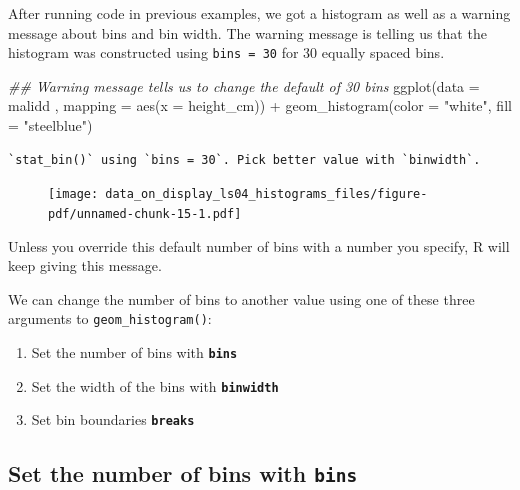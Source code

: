\documentclass[
  letterpaper,
  DIV=11,
  numbers=noendperiod]{scrreprt}
\newenvironment{Shaded}{\begin{snugshade}}{\end{snugshade}}
\newcommand{\AttributeTok}[1]{\textcolor[rgb]{0.40,0.45,0.13}{#1}}
\newcommand{\DocumentationTok}[1]{\textcolor[rgb]{0.37,0.37,0.37}{\textit{#1}}}
\newcommand{\FunctionTok}[1]{\textcolor[rgb]{0.28,0.35,0.67}{#1}}
\newcommand{\NormalTok}[1]{\textcolor[rgb]{0.00,0.23,0.31}{#1}}
\newcommand{\SpecialCharTok}[1]{\textcolor[rgb]{0.37,0.37,0.37}{#1}}
\newcommand{\StringTok}[1]{\textcolor[rgb]{0.13,0.47,0.30}{#1}}
\begin{document}
After running code in previous examples, we got a histogram as well as a
warning message about bins and bin width. The warning message is telling
us that the histogram was constructed using \texttt{bins\ =\ 30} for 30
equally spaced bins.

\begin{Shaded}
\begin{Highlighting}[]
\DocumentationTok{\#\# Warning message tells us to change the default of 30 bins}
\FunctionTok{ggplot}\NormalTok{(}\AttributeTok{data =}\NormalTok{  malidd , }
       \AttributeTok{mapping =} \FunctionTok{aes}\NormalTok{(}\AttributeTok{x =}\NormalTok{ height\_cm)) }\SpecialCharTok{+}
  \FunctionTok{geom\_histogram}\NormalTok{(}\AttributeTok{color =} \StringTok{"white"}\NormalTok{, }
                 \AttributeTok{fill =} \StringTok{"steelblue"}\NormalTok{)}
\end{Highlighting}
\end{Shaded}

\begin{verbatim}
`stat_bin()` using `bins = 30`. Pick better value with `binwidth`.
\end{verbatim}

\begin{figure}[H]

{\centering \texttt{[image: data\_on\_display\_ls04\_histograms\_files/figure-pdf/unnamed-chunk-15-1.pdf]}

}

\end{figure}

Unless you override this default number of bins with a number you
specify, R will keep giving this message.

We can change the number of bins to another value using one of these
three arguments to \texttt{geom\_histogram()}:

\begin{enumerate}
\def\labelenumi{\arabic{enumi}.}
\item
  Set the number of bins with \textbf{\texttt{bins}}
\item
  Set the width of the bins with \textbf{\texttt{binwidth}}
\item
  Set bin boundaries \textbf{\texttt{breaks}}
\end{enumerate}

\hypertarget{set-the-number-of-bins-with-bins}{%
\subsection{\texorpdfstring{Set the number of bins with
\texttt{bins}}{Set the number of bins with bins}}\label{set-the-number-of-bins-with-bins}}
\end{document}
